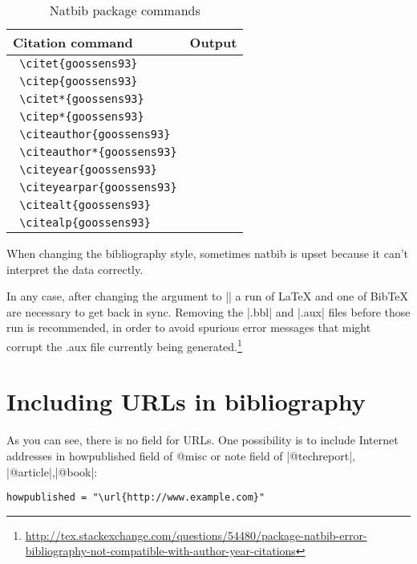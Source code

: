 \begin{refsection}
\begin{table}[htp]
\begin{tabular}{lp{8cm}}
\toprule
Citation command	&Output\\
\midrule
\verb+ \citet{goossens93}+	&\citet{goossens93}\\
\verb+ \citep{goossens93}+	&\citep{goossens93}\\
\verb+ \citet*{goossens93}+	&\citet*{goossens93}\\
\verb+ \citep*{goossens93}+	&\citep*{goossens93}\\
\verb+ \citeauthor{goossens93}+	&\citeauthor{goossens93} \\
\verb+ \citeauthor*{goossens93}+	&\citeauthor*{goossens93}\\
\verb+ \citeyear{goossens93}+	&\citeyear{goossens93}\\
\verb+ \citeyearpar{goossens93}+	&\citeyearpar{goossens93}\\
\verb+ \citealt{goossens93}+	&\citealt{goossens93}\\
\verb+ \citealp{goossens93}+	&\citealp{goossens93}\\
\bottomrule
\end{tabular}
\caption{Natbib package commands}
\end{table}

When changing the bibliography style, sometimes natbib is upset because it can't interpret the data correctly.

In any case, after changing the argument to || a run of LaTeX and one of BibTeX are necessary to get back in sync. Removing the |.bbl| and |.aux| files before those run is recommended, in order to avoid spurious error messages that might corrupt the .aux file currently being generated.\footnote{\url{http://tex.stackexchange.com/questions/54480/package-natbib-error-bibliography-not-compatible-with-author-year-citations}}

\section{Including URLs in bibliography}

As you can see, there is no field for URLs. One possibility is to include Internet addresses in howpublished field of @misc or note field of |@techreport|, |@article|,|@book|:

\begin{lstlisting}[language={[common]TeX},% 
                           alsolanguage={[LaTeX]TeX},% 
                           alsolanguage={[primitive]TeX},%
                           ]
howpublished = "\url{http://www.example.com}"
\end{lstlisting}


\end{refsection}
